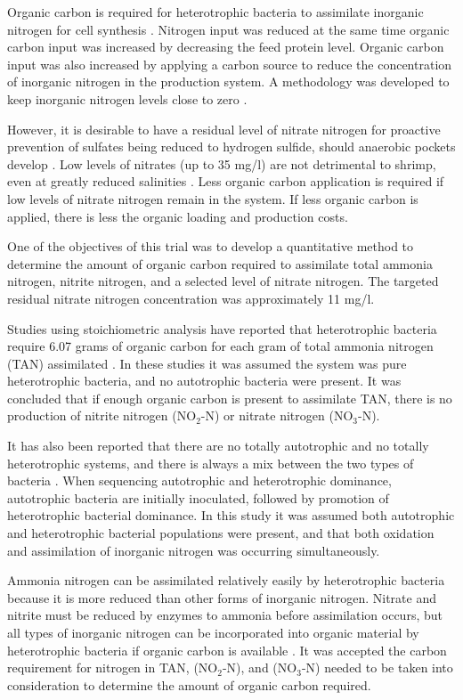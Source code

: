 \documentclass[useAMS,usenatbib]{tellus}
\begin{document}
Organic carbon is required for heterotrophic bacteria to assimilate inorganic nitrogen for cell synthesis \citep{ritmcc2001}. Nitrogen input was reduced at the same time organic carbon input was increased by decreasing the feed protein level.  Organic carbon input was also increased by applying a carbon source to reduce the concentration of inorganic nitrogen in the production system. A methodology was developed to keep inorganic nitrogen levels close to zero \citep{cro+al2013}.

However, it is desirable to have a residual level of nitrate nitrogen for proactive prevention of sulfates being reduced to hydrogen sulfide, should anaerobic pockets develop \citep{chuelm1999, usper2014}. Low levels of nitrates (up to 35 mg/l) are not detrimental to shrimp, even at greatly reduced salinities \citep{kuhn+al2010}. Less organic carbon application is required if low levels of nitrate nitrogen remain in the system. If less organic carbon is applied, there is less the organic loading and production costs. 

One of the objectives of this trial was to develop a quantitative method to determine the amount of organic carbon required to assimilate total ammonia nitrogen, nitrite nitrogen, and a selected level of nitrate nitrogen. The targeted residual nitrate nitrogen concentration was approximately 11 mg/l.

Studies using stoichiometric analysis have reported that heterotrophic bacteria require 6.07 grams of organic carbon for each gram of total ammonia nitrogen (TAN) assimilated \citep{ebe+al2006}. In these studies it was assumed the system was pure heterotrophic bacteria, and no autotrophic bacteria were present. It was concluded that if enough organic carbon is present to assimilate TAN, there is no production of nitrite nitrogen ($\text{NO}_2$-N) or nitrate nitrogen ($\text{NO}_3$-N).

It has also been reported that there are no totally autotrophic and no totally heterotrophic systems, and there is always a mix between the two types of bacteria \citep{avn2009}. When sequencing autotrophic and heterotrophic dominance, autotrophic bacteria are initially inoculated, followed by promotion of heterotrophic bacterial dominance. In this study it was assumed both autotrophic and heterotrophic bacterial populations were present, and that both oxidation and assimilation of inorganic nitrogen was occurring simultaneously. 

Ammonia nitrogen can be assimilated relatively easily by heterotrophic bacteria because it is more reduced than other forms of inorganic nitrogen. Nitrate and nitrite must be reduced by enzymes to ammonia before assimilation occurs, but all types of inorganic nitrogen can be incorporated into organic material by heterotrophic bacteria if organic carbon is available \citep{pre+al1990}. It was accepted the carbon requirement for nitrogen in TAN, ($\text{NO}_2$-N), and ($\text{NO}_3$-N) needed to be taken into consideration to determine the amount of organic carbon required.
\end{document}
